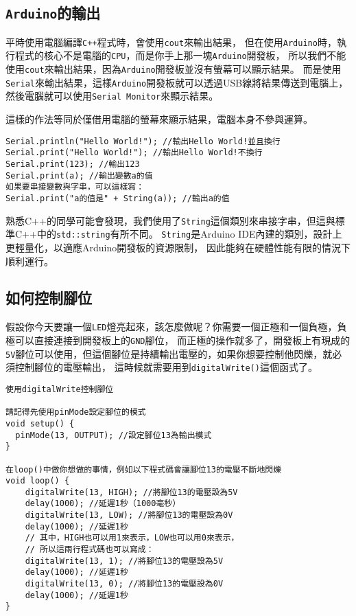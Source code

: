 \documentclass[12pt,a4paper]{article}
\begin{document}
\subsection{\texttt{Arduino}的輸出}
平時使用電腦編譯\texttt{C++}程式時，會使用\texttt{cout}來輸出結果，
但在使用\texttt{Arduino}時，執行程式的核心不是電腦的\texttt{CPU}，而是你手上那一塊\texttt{Arduino}開發板，
所以我們不能使用\texttt{cout}來輸出結果，因為\texttt{Arduino}開發板並沒有螢幕可以顯示結果。
而是使用\texttt{Serial}來輸出結果，這樣\texttt{Arduino}開發板就可以透過USB線將結果傳送到電腦上，
然後電腦就可以使用\texttt{Serial Monitor}來顯示結果。

這樣的作法等同於僅借用電腦的螢幕來顯示結果，電腦本身不參與運算。

\begin{lstlisting}
Serial.println("Hello World!"); //輸出Hello World!並且換行
Serial.print("Hello World!"); //輸出Hello World!不換行
Serial.print(123); //輸出123
Serial.print(a); //輸出變數a的值
如果要串接變數與字串，可以這樣寫：
Serial.print("a的值是" + String(a)); //輸出a的值
\end{lstlisting}

熟悉C++的同學可能會發現，我們使用了\texttt{String}這個類別來串接字串，但這與標準C++中的\texttt{std::string}有所不同。
\texttt{String}是Arduino IDE內建的類別，設計上更輕量化，以適應Arduino開發板的資源限制，
因此能夠在硬體性能有限的情況下順利運行。

\subsection{如何控制腳位}
假設你今天要讓一個\texttt{LED}燈亮起來，該怎麼做呢？你需要一個正極和一個負極，負極可以直接連接到開發板上的\texttt{GND}腳位，
而正極的操作就多了，開發板上有現成的\texttt{5V}腳位可以使用，但這個腳位是持續輸出電壓的，如果你想要控制他閃爍，就必須控制腳位的電壓輸出，
這時候就需要用到\texttt{digitalWrite()}這個函式了。
\begin{lstlisting}    
使用digitalWrite控制腳位

請記得先使用pinMode設定腳位的模式
void setup() {
  pinMode(13, OUTPUT); //設定腳位13為輸出模式
}

在loop()中做你想做的事情，例如以下程式碼會讓腳位13的電壓不斷地閃爍
void loop() {
    digitalWrite(13, HIGH); //將腳位13的電壓設為5V
    delay(1000); //延遲1秒（1000毫秒）
    digitalWrite(13, LOW); //將腳位13的電壓設為0V 
    delay(1000); //延遲1秒
    // 其中，HIGH也可以用1來表示，LOW也可以用0來表示，
    // 所以這兩行程式碼也可以寫成：
    digitalWrite(13, 1); //將腳位13的電壓設為5V
    delay(1000); //延遲1秒
    digitalWrite(13, 0); //將腳位13的電壓設為0V    
    delay(1000); //延遲1秒
}
\end{lstlisting}
\end{document}
